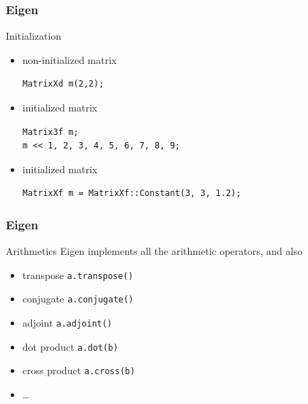 \documentclass[smaller,a4paper]{beamer}
\newcommand{\cpp}[1]{\lstinline!#1!}
\begin{document}

\begin{frame}[fragile]

    \frametitle{Eigen}

    \begin{block}{Initialization}
        \begin{itemize}
            \item non-initialized matrix
            \begin{lstlisting}
MatrixXd m(2,2);
            \end{lstlisting}
            \item initialized matrix
            \begin{lstlisting}
Matrix3f m;
m << 1, 2, 3, 4, 5, 6, 7, 8, 9;
            \end{lstlisting}
            \item initialized matrix
            \begin{lstlisting}
MatrixXf m = MatrixXf::Constant(3, 3, 1.2);
            \end{lstlisting}
        \end{itemize}

    \end{block}

\end{frame}


\begin{frame}[fragile]

    \frametitle{Eigen}

    \begin{block}{Arithmetics}
        Eigen implements all the arithmetic operators, and also
        \begin{itemize}
            \item transpose \cpp{a.transpose()}
            \item conjugate \cpp{a.conjugate()}
            \item adjoint \cpp{a.adjoint()}
            \item dot product \cpp{a.dot(b)}
            \item cross product \cpp{a.cross(b)}
            \item \ldots
        \end{itemize}

    \end{block}

\end{frame}
\end{document}
